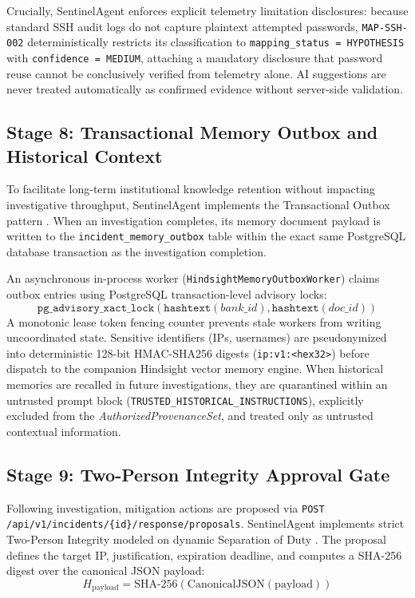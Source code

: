 \documentclass[conference]{IEEEtran}
\begin{document}
Crucially, SentinelAgent enforces explicit telemetry limitation disclosures: because standard SSH audit logs do not capture plaintext attempted passwords, \texttt{MAP-SSH-002} deterministically restricts its classification to \texttt{mapping\_status = HYPOTHESIS} with \texttt{confidence = MEDIUM}, attaching a mandatory disclosure that password reuse cannot be conclusively verified from telemetry alone. AI suggestions are never treated automatically as confirmed evidence without server-side validation.

\subsection{Stage 8: Transactional Memory Outbox and Historical Context}
To facilitate long-term institutional knowledge retention without impacting investigative throughput, SentinelAgent implements the Transactional Outbox pattern \cite{richardson2018microservices}. When an investigation completes, its memory document payload is written to the \texttt{incident\_memory\_outbox} table within the exact same PostgreSQL database transaction as the investigation completion.

An asynchronous in-process worker (\texttt{HindsightMemoryOutboxWorker}) claims outbox entries using PostgreSQL transaction-level advisory locks:
\begin{equation}
\texttt{pg\_advisory\_xact\_lock}(\texttt{hashtext}(bank\_id), \texttt{hashtext}(doc\_id))
\end{equation}
A monotonic lease token fencing counter prevents stale workers from writing uncoordinated state. Sensitive identifiers (IPs, usernames) are pseudonymized into deterministic 128-bit HMAC-SHA256 digests (\texttt{ip:v1:<hex32>}) before dispatch to the companion Hindsight vector memory engine. When historical memories are recalled in future investigations, they are quarantined within an untrusted prompt block (\texttt{TRUSTED\_HISTORICAL\_INSTRUCTIONS}), explicitly excluded from the \textit{AuthorizedProvenanceSet}, and treated only as untrusted contextual information.

\subsection{Stage 9: Two-Person Integrity Approval Gate}
Following investigation, mitigation actions are proposed via \texttt{POST /api/v1/incidents/\{id\}/response/proposals}. SentinelAgent implements strict Two-Person Integrity modeled on dynamic Separation of Duty \cite{ahn2000role}. The proposal defines the target IP, justification, expiration deadline, and computes a SHA-256 digest over the canonical JSON payload:
\begin{equation}
H_{\text{payload}} = \text{SHA-256}(\text{CanonicalJSON}(\text{payload}))
\end{equation}
\end{document}
